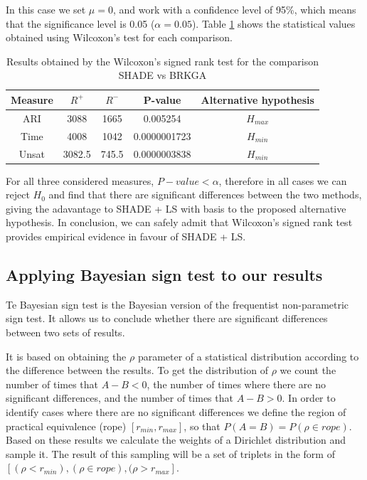 \documentclass[review]{elsarticle}
\begin{document}
In this case we set $\mu = 0$, and work with a confidence level of 95\%, which means that the significance level is 0.05 ($\alpha = 0.05$). Table \ref{tab:freqTest} shows the statistical values obtained using Wilcoxon's test for each comparison.
	
\begin{table}[!htp]
	\centering
	\setlength{\tabcolsep}{7pt}
	\renewcommand{\arraystretch}{1.4}
	\begin{tabular}{ccccc}
		\hline
		Measure & $R^{+}$ & $R^{-}$ & P-value & Alternative hypothesis  \\
		\hline
		ARI & 3088 & 1665 & 0.005254 & $H_{max}$ \\
		Time & 4008 & 1042 & 0.0000001723 & $H_{min}$ \\  
		Unsat & 3082.5 & 745.5 & 0.0000003838 & $H_{min}$ \\ 
		\hline 
	\end{tabular}
	\caption{Results obtained by the Wilcoxon's signed rank test for the comparison SHADE vs BRKGA}
	\label{tab:freqTest}
\end{table}

For all three considered measures, $P-value < \alpha$, therefore in all cases we can reject $H_0$ and find that there are significant differences between the two methods, giving the adavantage to SHADE + LS with basis to the proposed alternative hypothesis. In conclusion, we can safely admit that Wilcoxon's signed rank test provides empirical evidence in favour of SHADE + LS.

\subsection{Applying Bayesian sign test to our results}

Te Bayesian sign test is the Bayesian version of the frequentist non-parametric sign test. It allows us to conclude whether there are significant differences between two sets of results.\cite{carrasco2017rnpbst}

It is based on obtaining the $\rho$ parameter of a statistical distribution according to the difference between the results. To get the distribution of $\rho$ we count the number of times that $A - B<0$, the number of times where there are no significant differences, and the number of times that $A - B > 0$. In order to identify cases where there are no significant differences we define the region of practical equivalence (rope) $[r_{min}, r_{max}]$, so that $P(A = B) = P(\rho \in rope)$. Based on these results we calculate the weights of a Dirichlet distribution and sample it. The result of this sampling will be a set of triplets in the form of $[(\rho < r_{min}), (\rho \in rope), (\rho > r_{max}]$.
\end{document}
